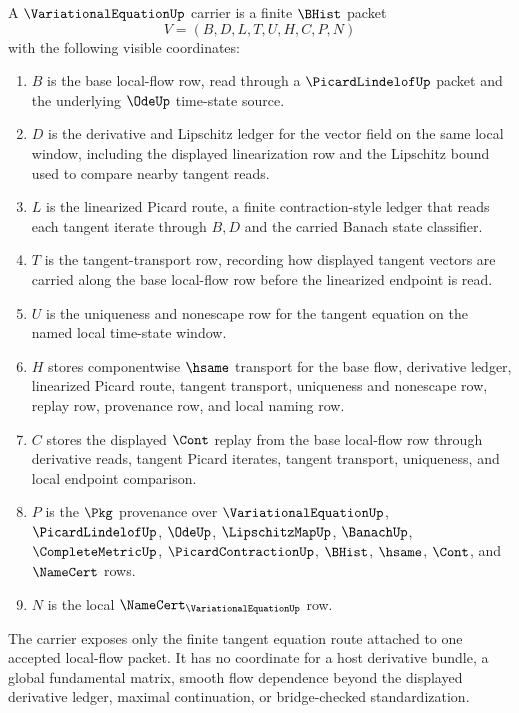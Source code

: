\begin{definition}
\label{def:variational-equation-carrier}
A $\VariationalEquationUp$ carrier is a finite $\BHist$ packet
$$
V=(B,D,L,T,U,H,C,P,N)
$$
with the following visible coordinates:
\begin{enumerate}
\item $B$ is the base local-flow row, read through a $\PicardLindelofUp$ packet and the underlying $\OdeUp$ time-state source.
\item $D$ is the derivative and Lipschitz ledger for the vector field on the same local window, including the displayed linearization row and the Lipschitz bound used to compare nearby tangent reads.
\item $L$ is the linearized Picard route, a finite contraction-style ledger that reads each tangent iterate through $B,D$ and the carried Banach state classifier.
\item $T$ is the tangent-transport row, recording how displayed tangent vectors are carried along the base local-flow row before the linearized endpoint is read.
\item $U$ is the uniqueness and nonescape row for the tangent equation on the named local time-state window.
\item $H$ stores componentwise $\hsame$ transport for the base flow, derivative ledger, linearized Picard route, tangent transport, uniqueness and nonescape row, replay row, provenance row, and local naming row.
\item $C$ stores the displayed $\Cont$ replay from the base local-flow row through derivative reads, tangent Picard iterates, tangent transport, uniqueness, and local endpoint comparison.
\item $P$ is the $\Pkg$ provenance over $\VariationalEquationUp$, $\PicardLindelofUp$, $\OdeUp$, $\LipschitzMapUp$, $\BanachUp$, $\CompleteMetricUp$, $\PicardContractionUp$, $\BHist$, $\hsame$, $\Cont$, and $\NameCert$ rows.
\item $N$ is the local $\NameCert_{\VariationalEquationUp}$ row.
\end{enumerate}
The carrier exposes only the finite tangent equation route attached to one accepted local-flow packet. It has no coordinate for a host derivative bundle, a global fundamental matrix, smooth flow dependence beyond the displayed derivative ledger, maximal continuation, or bridge-checked standardization.
\end{definition}


